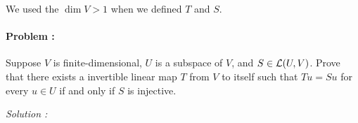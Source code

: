 \begin{remark}
    We used the $\dim V > 1$ when we defined $T$ and $S$.
\end{remark}

\paragraph{Problem :} Suppose $V$ is finite-dimensional, $U$ is a subspace of $V$, and $S \in \operatorname{\mathcal{L}}(U,V)$. Prove that there exists a invertible
linear map $T$ from $V$ to itself such that $Tu=Su$ for every $u \in U$ if and only if $S$ is injective.

\vspace{4mm}
\textit{Solution :}
